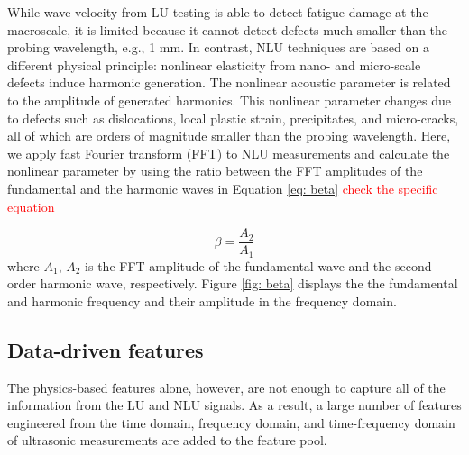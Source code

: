 \begin{itemize}
    While wave velocity from LU testing is able to detect fatigue damage at the macroscale, it is limited because it cannot detect defects much smaller than the probing wavelength, e.g., 1 mm. In contrast, NLU techniques are based on a different physical principle: nonlinear elasticity from nano- and micro-scale defects induce harmonic generation. The nonlinear acoustic parameter is related to the amplitude of generated harmonics. This nonlinear parameter changes due to defects such as dislocations, local plastic strain, precipitates, and micro-cracks, all of which are orders of magnitude smaller than the probing wavelength. Here, we apply fast Fourier transform (FFT) to NLU measurements and calculate the nonlinear parameter by using the ratio between the FFT amplitudes of the fundamental and the harmonic waves in Equation \eqref{eq: beta} \textcolor{red}{check the specific equation}

    \begin{equation}
        \beta = \frac{A_2}{A_1}
        \label{eq: beta}
    \end{equation}
    where $A_1$, $A_2$ is the FFT amplitude of the fundamental wave and the second-order harmonic wave, respectively. Figure \ref{fig: beta} displays the the fundamental and harmonic frequency and their amplitude in the frequency domain.
\end{itemize}

\subsection{Data-driven features}
The physics-based features alone, however, are not enough to capture all of the information from the LU and NLU signals. As a result, a large number of features engineered from the time domain, frequency domain, and time-frequency domain of ultrasonic measurements are added to the feature pool.

